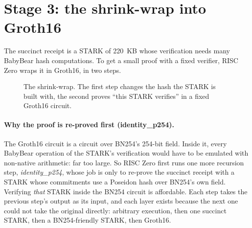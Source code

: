 \documentclass[11pt]{article}
\begin{document}
\section{Stage 3: the shrink-wrap into Groth16}
\label{sec:wrap}

The succinct receipt is a STARK of 220~KB whose verification needs many
BabyBear hash computations. To get a small proof with a fixed verifier,
RISC Zero wraps it in Groth16, in two steps.

\begin{figure}[H]
\centering
{}
\caption{The shrink-wrap. The first step changes the hash the STARK is
built with, the second proves ``this STARK verifies'' in a fixed Groth16
circuit.}
\label{fig:wrap}
\end{figure}

\paragraph{Why the proof is re-proved first (identity\_p254).} The
Groth16 circuit is a circuit over BN254's 254-bit field. Inside it,
every BabyBear operation of the STARK's verification would have to be
emulated with non-native arithmetic: far too large. So RISC Zero first
runs one more recursion step, \emph{identity\_p254}, whose job is only
to re-prove the succinct receipt with a STARK whose commitments use a
Poseidon hash over BN254's own field. Verifying \emph{that} STARK inside
the BN254 circuit is affordable. Each step takes the previous step's
output as its input, and each layer exists because the next one could
not take the original directly: arbitrary execution, then one succinct
STARK, then a BN254-friendly STARK, then Groth16.
\end{document}
